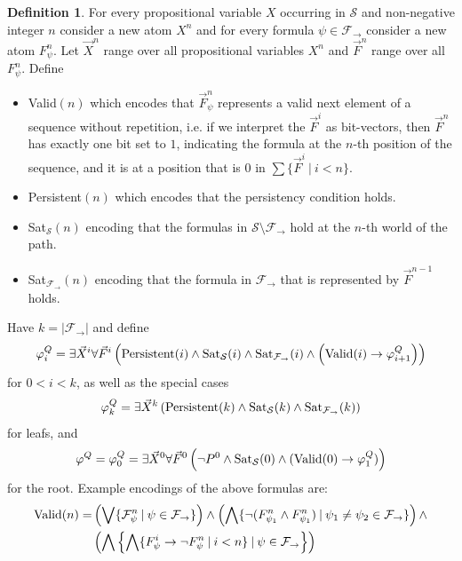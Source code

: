 \documentclass[a4paper,11pt]{report}
\theoremstyle{definition}
\theoremstyle{definition}
\theoremstyle{definition}
\theoremstyle{definition}
\theoremstyle{definition}
\newtheorem{definition}[theorem]{Definition}
\theoremstyle{definition}
\theoremstyle{definition}
\begin{document}
	\begin{definition}
		For every propositional variable $X$ occurring in $\mathcal S$ and non-negative integer $n$ consider a new atom $X^n$ and for every formula $\psi\in\mathcal F_\to$ consider a new atom $F_\psi^n$. Let $\vec X^n$ range over all propositional variables $X^n$ and $\vec F^n$ range over all $F_\psi^n$. Define
		\begin{itemize}
			\item {\normalfont Valid}$(n)$ which encodes that $\vec F^n_\psi$ represents a valid next element of a sequence without repetition, i.e. if we interpret the $\vec F^i$ as bit-vectors, then $\vec F^n$ has exactly one bit set to $1$, indicating the formula at the $n$-th position of the sequence, and it is at a position that is $0$ in $\sum\{\vec F^i\:|\:i < n\}$.
			\item {\normalfont Persistent}$(n)$ which encodes that the persistency condition holds.
			\item {\normalfont Sat}$_{\mathcal S}(n)$ encoding that the formulas in $\mathcal S\setminus\mathcal F_\to$ hold at the $n$-th world of the path.
			\item {\normalfont Sat}$_{\mathcal F_\to}(n)$ encoding that the formula in $\mathcal F_\to$ that is represented by $\vec F^{n-1}$ holds.
		\end{itemize}
		Have $k = |\mathcal F_\to|$ and define$$\varphi^Q_{i} = \exists \vec X^i\forall \vec F^i\left(\text{\normalfont Persistent}(i)\wedge \text{\normalfont Sat}_{\mathcal S}(i)\wedge \text{\normalfont Sat}_{\mathcal F_\to}(i)\wedge\left(\text{\normalfont Valid}(i)\to \varphi^Q_{i+1}\right)\right)$$
		for $0 < i < k$, as well as the special cases
		$$\varphi^Q_{k} = \exists \vec X^k\left(\text{\normalfont Persistent}(k)\wedge \text{\normalfont Sat}_{\mathcal S}(k)\wedge \text{\normalfont Sat}_{\mathcal F_\to}(k)\right)$$
		for leafs, and $$\varphi^Q = \varphi_0^Q = \exists \vec X^0\forall \vec F^0\left(\neg P^0\wedge \text{\normalfont Sat}_{\mathcal S}(0)\wedge(\text{\normalfont Valid}(0)\to \varphi_1^Q)\right)$$for the root.
		Example encodings of the above formulas are:
		\begin{align*}
			\text{\normalfont Valid}(n) = &\left(\bigvee \{\mathcal F^n_\psi\:|\:\psi\in\mathcal F_\to\}\right)\wedge\left(\bigwedge \{\neg(F^n_{\psi_1}\wedge F^n_{\psi_1})\:|\:\psi_1\neq\psi_2\in\mathcal F_\to\}\right)\wedge\\&\left(\bigwedge\left\{\bigwedge\{F^i_\psi\to\neg F^n_\psi\:|\:i < n\}\:|\:\psi\in\mathcal F_\to\right\}\right)\\

\end{align*}
\end{definition}
\end{document}
